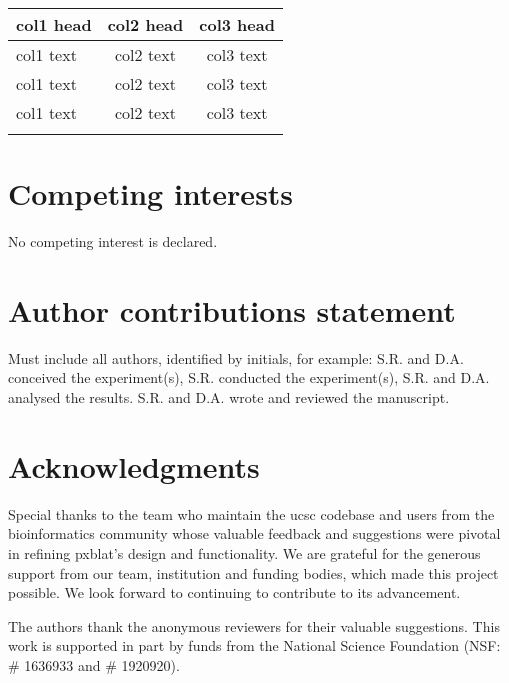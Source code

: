 \documentclass[unnumsec,webpdf,contemporary,large]{oup-authoring-template}%
\theoremstyle{thmstyleone}%
\theoremstyle{thmstyletwo}%
\theoremstyle{thmstylethree}%
\begin{document}
\begin{appendices}
	\begin{table}
		\begin{center}
			\begin{minipage}{.52\columnwidth}
				\caption{}{%
					\begin{tabular}{lcc}%
						\toprule
						col1 head & col2 head & col3 head \\
						\midrule
						col1 text & col2 text & col3 text \\
						col1 text & col2 text & col3 text \\
						col1 text & col2 text & col3 text \\
						\botrule
					\end{tabular}}{}
			\end{minipage}
		\end{center}
	\end{table}

\end{appendices}

\section{Competing interests}
No competing interest is declared.

\section{Author contributions statement}

Must include all authors, identified by initials, for example:
S.R. and D.A. conceived the experiment(s),  S.R. conducted the experiment(s), S.R. and D.A. analysed the results.  S.R. and D.A. wrote and reviewed the manuscript.

\section{Acknowledgments}

Special thanks to the team who maintain the \gls{ucsc} codebase and users from the bioinformatics community whose valuable feedback and suggestions were pivotal in refining \gls{pxblat}'s design and functionality.
We are grateful for the generous support from our team, institution and funding bodies, which made this project possible.
We look forward to continuing to contribute to its advancement.


The authors thank the anonymous reviewers for their valuable suggestions. This work is supported in part by funds from the National Science Foundation (NSF: \# 1636933 and \# 1920920).
\end{document}
